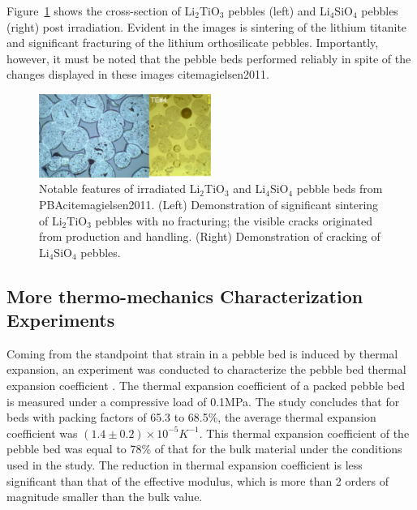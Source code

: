 Figure~\ref{fig:pba} shows the cross-section of Li$_2$TiO$_3$ pebbles (left) and Li$_4$SiO$_4$ pebbles (right) post irradiation. Evident in the images is sintering of the lithium titanite and significant fracturing of the lithium orthosilicate pebbles. Importantly, however, it must be noted that the pebble beds performed reliably in spite of the changes displayed in these images cite{magielsen2011}. 


\begin{figure}[t!]
\centering
\includegraphics[width=0.5\textwidth]{chapters/figures/Fig-10}
\caption{Notable features of irradiated Li$_2$TiO$_3$ and Li$_4$SiO$_4$ pebble beds from PBAcite{magielsen2011}. (Left) Demonstration of significant sintering of Li$_2$TiO$_3$ pebbles with no fracturing; the visible cracks originated from production and handling. (Right) Demonstration of cracking of Li$_4$SiO$_4$ pebbles.}
\label{fig:pba}
\end{figure}


\subsection{More thermo-mechanics Characterization Experiments}
Coming from the standpoint that strain in a pebble bed is induced by thermal expansion, an experiment was conducted to characterize the pebble bed thermal expansion coefficient \cite{Tanigawa:2007fc}.  The thermal expansion coefficient of a packed \lit pebble bed is measured under a compressive load of 0.1MPa.  The study concludes that for beds with packing factors of 65.3 to 68.5\%, the average thermal expansion coefficient was $(1.4\pm0.2)\times10^{-5}K^{-1}$. This thermal expansion coefficient of the pebble bed was equal to 78\% of that for the bulk material under the conditions used in the study. The reduction in thermal expansion coefficient is less significant than that of the effective modulus, which is more than 2 orders of magnitude smaller than the bulk value. 


